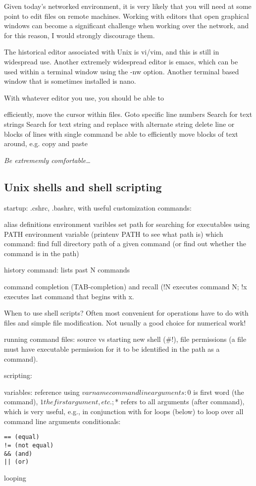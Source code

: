 \documentclass{article}
\newcommand{\test}[1]{%
    \begin{center}
        \colorbox{hl}{\parbox{0.9\textwidth}{\emph{#1}}}
    \end{center}}
\begin{document}
Given today's networked environment, it is very likely that you will
need at some point to edit files on remote machines. Working with
editors that open graphical windows can become a significant challenge
when working over the network, and for this reason, I would strongly
discourage them.

The historical editor associated with Unix is vi/vim, and this is
still in widespread use. Another extremely widespread editor is emacs,
which can be used within a terminal window using the -nw option.
Another terminal based window that is sometimes installed is nano.

With whatever editor you use, you should be able to

efficiently, move the cursor within files. Goto specific line numbers
Search for text strings
Search for text string and replace with alternate string
delete line or blocks of lines with single command
be able to efficiently move blocks of text around, e.g. copy and paste

\test{Be extrememly comfortable\ldots}



\subsection{Unix shells and shell scripting}

startup: .cshrc, .bashrc, with useful customization commands:

alias definitions
environment varibles
set path for searching for executables using PATH environment variable
(printenv PATH to see what path is)
which command: find full directory path of a given command (or find
out whether the command is in the path)

history command: lists past N commands

command completion (TAB-completion) and recall (!N executes command N;
!x executes last command that begins with x.

When to use shell scripts? Often most convenient for operations have
to do with files and simple file modification. Not usually a good
choice for numerical work!

running command files: source vs starting new shell (\#!), file
permissions (a file must have executable permission for it to be
identified in the path as a command).

scripting:

variables: reference using $varname
command line arguments: $0 is first word (the command), $1 the first
argument, etc.; $* refers to all arguments (after command), which is
very useful, e.g., in conjunction with for loops (below) to loop over
all command line arguments
conditionals:
\begin{verbatim}
== (equal)
!= (not equal)
&& (and)
|| (or)
\end{verbatim}
looping
\end{document}
